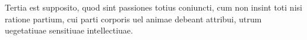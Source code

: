 \documentclass{article}
\begin{document}
\beginnumbering
\pstart
Tertia est supposito, quod sint passiones totius coniuncti, cum non insint toti nisi ratione partium, cui parti corporis uel animae debeant attribui, utrum uegetatiuae  sensitiuae 
intellectiuae.
\pend
\endnumbering
\end{document}
